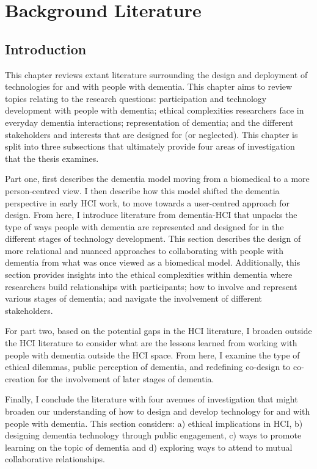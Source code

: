 \chapter{Background Literature}
\label{BackgroundLit}

\section{Introduction}
\label{BL:Intro}
This chapter reviews extant literature surrounding the design and deployment of technologies for and with people with dementia. This chapter aims to review topics relating to the research questions: participation and technology development with people with dementia; ethical complexities researchers face in everyday dementia interactions; representation of dementia; and the different stakeholders and interests that are designed for (or neglected). This chapter is split into three subsections that ultimately provide four areas of investigation that the thesis examines.

Part one, first describes the dementia model moving from a biomedical to a more person-centred view. I then describe how this model shifted the dementia perspective in early HCI work, to move towards a user-centred approach for design. From here, I introduce literature from dementia-HCI that unpacks the type of ways people with dementia are represented and designed for in the different stages of technology development. This section describes the design of more relational and nuanced approaches to collaborating with people with dementia from what was once viewed as a biomedical model. Additionally, this section provides insights into the ethical complexities within dementia where researchers build relationships with participants; how to involve and represent various stages of dementia; and navigate the involvement of different stakeholders.

For part two, based on the potential gaps in the HCI literature, I broaden outside the HCI literature to consider what are the lessons learned from working with people with dementia outside the HCI space. From here, I examine the type of ethical dilemmas, public perception of dementia, and redefining co-design to co-creation for the involvement of later stages of dementia.

Finally, I conclude the literature with four avenues of investigation that might broaden our understanding of how to design and develop technology for and with people with dementia. This section considers: a) ethical implications in HCI, b) designing dementia technology through public engagement, c) ways to promote learning on the topic of dementia and d) exploring ways to attend to mutual collaborative relationships.


